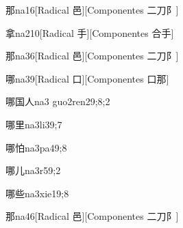 
\begin{verbete}{那}{na1}{6}[Radical 邑][Componentes 二刀阝]
\end{verbete}

\begin{verbete}{拿}{na2}{10}[Radical 手][Componentes 合手]
\end{verbete}

\begin{verbete}{那}{na3}{6}[Radical 邑][Componentes 二刀阝]
\end{verbete}

\begin{verbete}{哪}{na3}{9}[Radical 口][Componentes 口那]
\end{verbete}

\begin{verbete}{哪国人}{na3 guo2ren2}{9;8;2}
\end{verbete}

\begin{verbete}{哪里}{na3li3}{9;7}
\end{verbete}

\begin{verbete}{哪怕}{na3pa4}{9;8}
\end{verbete}

\begin{verbete}{哪儿}{na3r5}{9;2}
\end{verbete}

\begin{verbete}{哪些}{na3xie1}{9;8}
\end{verbete}

\begin{verbete}{那}{na4}{6}[Radical 邑][Componentes 二刀阝]
\end{verbete}

